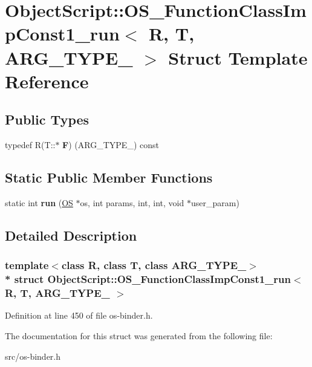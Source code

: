 \hypertarget{struct_object_script_1_1_o_s___function_class_imp_const1__run}{}\section{Object\+Script\+:\+:O\+S\+\_\+\+Function\+Class\+Imp\+Const1\+\_\+run$<$ R, T, A\+R\+G\+\_\+\+T\+Y\+P\+E\+\_ $>$ Struct Template Reference}
\label{struct_object_script_1_1_o_s___function_class_imp_const1__run}
\subsection*{Public Types}
\begin{DoxyCompactItemize}
\item 
typedef R(T\+::$\ast$ {\bfseries F}) (A\+R\+G\+\_\+\+T\+Y\+P\+E\+\_) const \hypertarget{struct_object_script_1_1_o_s___function_class_imp_const1__run_ac102adc29e1a6be891e0fd821cd58893}{}\label{struct_object_script_1_1_o_s___function_class_imp_const1__run_ac102adc29e1a6be891e0fd821cd58893}

\end{DoxyCompactItemize}
\subsection*{Static Public Member Functions}
\begin{DoxyCompactItemize}
\item 
static int {\bfseries run} (\hyperlink{class_object_script_1_1_o_s}{OS} $\ast$os, int params, int, int, void $\ast$user\+\_\+param)\hypertarget{struct_object_script_1_1_o_s___function_class_imp_const1__run_a192e6f3f0326eaf8b6467f9710c7768e}{}\label{struct_object_script_1_1_o_s___function_class_imp_const1__run_a192e6f3f0326eaf8b6467f9710c7768e}

\end{DoxyCompactItemize}


\subsection{Detailed Description}
\subsubsection*{template$<$class R, class T, class A\+R\+G\+\_\+\+T\+Y\+P\+E\+\_$>$\\*
struct Object\+Script\+::\+O\+S\+\_\+\+Function\+Class\+Imp\+Const1\+\_\+run$<$ R, T, A\+R\+G\+\_\+\+T\+Y\+P\+E\+\_ $>$}



Definition at line 450 of file os-\/binder.\+h.



The documentation for this struct was generated from the following file\+:\begin{DoxyCompactItemize}
\item 
src/os-\/binder.\+h\end{DoxyCompactItemize}
